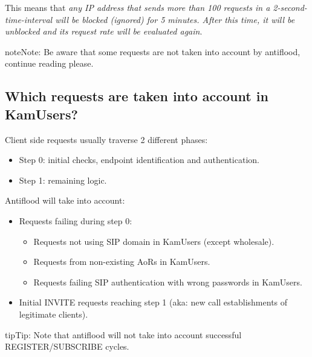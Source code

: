 \documentclass[letterpaper,10pt,english]{sphinxmanual}
\begin{document}
This means that \emph{any IP address that sends more than 100 requests in a 2-second-time-interval will be blocked (ignored)
for 5 minutes. After this time, it will be unblocked and its request rate will be evaluated again}.

\begin{notice}{note}{Note:}
Be aware that some requests are not taken into account by antiflood, continue reading please.
\end{notice}


\subsection{Which requests are taken into account in KamUsers?}
\label{security_and_maintenance/security/antiflooding:which-requests-are-taken-into-account-in-kamusers}
Client side requests usually traverse 2 different phases:
\begin{itemize}
\item {} 
Step 0: initial checks, endpoint identification and authentication.

\item {} 
Step 1: remaining logic.

\end{itemize}

Antiflood will take into account:
\begin{itemize}
\item {} 
Requests failing during step 0:
\begin{itemize}
\item {} 
Requests not using SIP domain in KamUsers (except wholesale).

\item {} 
Requests from non-existing AoRs in KamUsers.

\item {} 
Requests failing SIP authentication with wrong passwords in KamUsers.

\end{itemize}

\item {} 
Initial INVITE requests reaching step 1 (aka: new call establishments of legitimate clients).

\end{itemize}

\begin{notice}{tip}{Tip:}
Note that antiflood will not take into account successful REGISTER/SUBSCRIBE cycles.
\end{notice}
\end{document}
